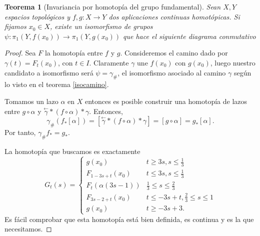 \documentclass[12pt,a4paper]{book}
\newtheorem{thm}{Teorema}[section]
\theoremstyle{definition} \newtheorem{defn}[thm]{Definición}
\theoremstyle{definition} \newtheorem{ejemplo}[thm]{Ejemplo}
\theoremstyle{definition} \newtheorem{ejercicio}[thm]{Ejercicio}
\theoremstyle{remark} \newtheorem*{obs}{Observación}
\def\gf{\pi_1}
\newcommand\cev[1]{\overset{\leftarrow}{#1}}
\begin{document}
\begin{thm}[Invariancia por homotopía del grupo fundamental]
  Sean $X,Y$ espacios topológicos y $f,g:X\rightarrow Y$ dos aplicaciones continuas homotópicas. Si fijamos $x_0\in X$, existe un isomorfismo de grupos $\psi:\gf(Y,f(x_0)) \rightarrow \gf(Y,g(x_0))$ que hace el siguiente diagrama conmutativo
  \begin{center}
   \end{center}
\end{thm}
\begin{proof}
  Sea $F$ la homotopía entre $f$ y $g$. Consideremos el camino dado por $\gamma(t)=F_t(x_0)$, con $t\in I$. Claramente $\gamma$ une $f(x_0)$ con $g(x_0)$, luego nuestro candidato a isomorfismo será $\psi=\gamma_{\#}$, el isomorfismo asociado al camino $\gamma$ según lo visto en el teorema \ref{isocamino}. 

Tomamos un lazo $\alpha$ en $X$ entonces es posible construir una homotopía de lazos entre $g\circ \alpha$ y $\cev{\gamma}*(f\circ \alpha)*\gamma$. Entonces, 
  \begin{equation*}
    \gamma_{\#}(f_*[\alpha])=[\cev{\gamma}*(f\circ \alpha)*\gamma]=[g\circ \alpha]=g_*[\alpha].
  \end{equation*}
  Por tanto, $\gamma_{\#}f_*=g_*$.

  La homotopía que buscamos es exactamente
  \begin{equation*}
    G_t(s)=
    \begin{cases}
      g(x_0) & t\geq3s, s\leq\tfrac{1}{3} \\
      F_{1-3s+t}(x_0) & t \leq3s, s\leq \tfrac{1}{3}\\
      F_{t}(\alpha(3s-1)) & \tfrac{1}{3} \leq s \leq \tfrac{2}{3} \\
      F_{3s-2+t}(x_0) & t\leq -3s+t, \tfrac{2}{3} \leq s \leq 1 \\
      g(x_0) & t\geq -3s+3.
    \end{cases}
  \end{equation*}
  Es fácil comprobar que esta homotopía está bien definida, es continua y es la que necesitamos.
\end{proof}
\end{document}
